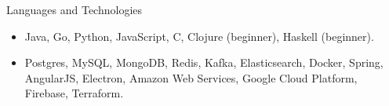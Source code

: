 \documentclass[]{cv}
\begin{document}
	\begin{cvsection}{Languages and Technologies}
		\begin{cvsubsection}{}{}{}	
			\begin{itemize}
				\item Java, Go, Python, JavaScript, C, Clojure (beginner), Haskell (beginner).
				\item Postgres, MySQL, MongoDB, Redis, Kafka, Elasticsearch, Docker, Spring, AngularJS, Electron, Amazon Web Services, Google Cloud Platform, Firebase, Terraform.
			\end{itemize}
		\end{cvsubsection}
	\end{cvsection}
	
\end{document}
